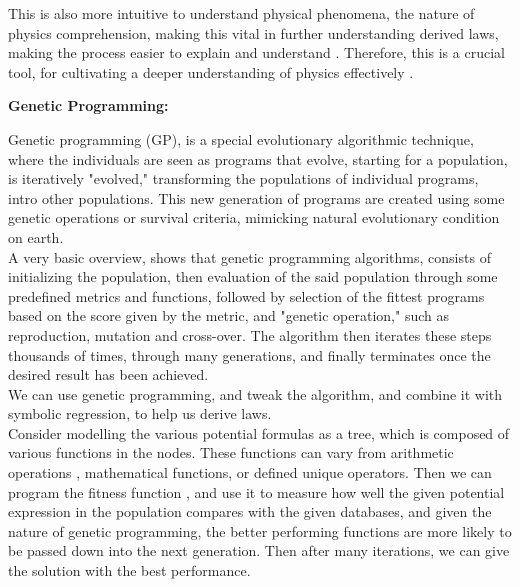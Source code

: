 \documentclass{article}
\begin{document}
This is also more intuitive to understand physical phenomena, the nature of physics comprehension, making this vital in further understanding derived laws, making the process easier to explain and understand \cite{Taber2009}. Therefore, this is a crucial tool, for cultivating a deeper understanding of physics effectively \cite{Tenachi2023}. \\






\begin{center} 
  \textbf {\Large Genetic Programming:}
\end{center}


Genetic programming (GP), is a special evolutionary algorithmic technique, where the individuals are seen as programs that evolve, starting for a population, is iteratively "evolved," transforming the populations of individual programs, intro other populations. This new generation of programs are created using some genetic operations or survival criteria, mimicking natural evolutionary condition on earth.\\ 

A very basic overview, shows that genetic programming algorithms, consists of initializing the population, then evaluation of the said population through some predefined metrics and functions, followed by selection of the fittest programs based on the score given by the metric, and "genetic operation," such as reproduction, mutation and cross-over. The algorithm then iterates these steps thousands of times, through many generations, and finally terminates once the desired result has been achieved.\\

We can use genetic programming, and tweak the algorithm, and combine it with symbolic regression, to help us derive laws. \\

Consider modelling the various potential formulas as a tree, which is composed of various functions in the nodes. These functions can vary from arithmetic operations  , mathematical functions, or defined unique operators. Then we can program the fitness function \cite{Angeline1994}, and use it to measure how well the given potential expression in the population compares with the given databases, and given the nature of genetic programming, the better performing functions are more likely to be passed down into the next generation. Then after many iterations, we can give the solution with the best performance. \\ 
\end{document}
